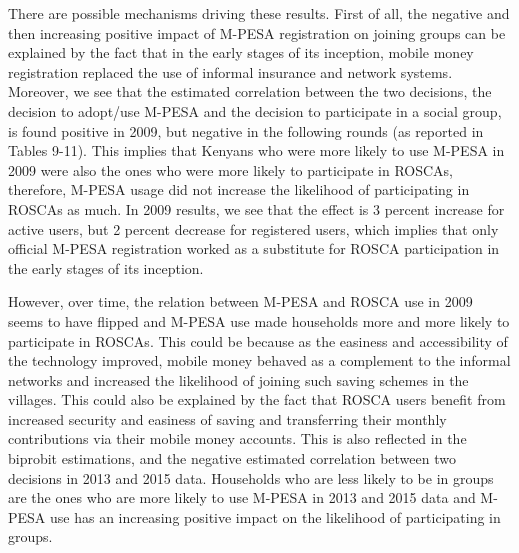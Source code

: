 \documentclass[11pt]{article}
\numberwithin{equation}{section}
\begin{document}
There are possible mechanisms driving these results. First of all, the negative and then increasing positive impact of M-PESA registration on joining groups can be explained by the fact that in the early stages of its inception, mobile money registration replaced the use of informal insurance and network systems. Moreover, we see that the estimated correlation between the two decisions, the decision to adopt/use M-PESA and the decision to participate in a social group, is found positive in 2009, but negative in the following rounds (as reported in Tables 9-11). This implies that Kenyans who were more likely to use M-PESA in 2009 were also the ones who were more likely to participate in ROSCAs, therefore, M-PESA usage did not increase the likelihood of participating in ROSCAs as much. In 2009 results, we see that the effect is 3 percent increase for active users, but 2 percent decrease for registered users, which implies that only official M-PESA registration worked as a substitute for ROSCA participation in the early stages of its inception.

However, over time, the relation between M-PESA and ROSCA use in 2009 seems to have flipped and M-PESA use made households more and more likely to participate in ROSCAs. This could be because as the easiness and accessibility of the technology improved, mobile money behaved as a complement to the informal networks and increased the likelihood of joining such saving schemes in the villages. This could also be explained by the fact that ROSCA users benefit from increased security and easiness of saving and transferring their monthly contributions via their mobile money accounts. This is also reflected in the biprobit estimations, and the negative estimated correlation between two decisions in 2013 and 2015 data. Households who are less likely to be in groups are the ones who are more likely to use M-PESA in 2013 and 2015 data and M-PESA use has an increasing positive impact on the likelihood of participating in groups. 
\end{document}
